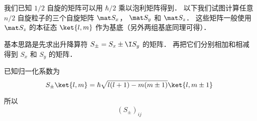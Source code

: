 

我们已知 $1/2$ 自旋的矩阵可以用 $\hbar/2$ 乘以泡利矩阵得到． 以下我们试图计算任意 $n/2$ 自旋粒子的三个自旋矩阵 $\mat S_x$， $\mat S_y$ 和 $\mat S_z$． 这些矩阵一般使用 $\mat S_z$ 的本征态 $\ket{l, m}$ 作为基底（另外两组基底同理可得）．

基本思路是先求出升降算符 $S_\pm = S_x \pm \I S_y$ 的矩阵． 再把它们分别相加和相减得到 $S_x$ 和 $S_y$ 的矩阵．

已知归一化系数为
\begin{equation}
S_\pm \ket{l,m} = \hbar \sqrt{l(l + 1) - m(m \pm 1)} \ket{l,m\pm1}
\end{equation}

所以
\begin{equation}
(S_\pm)_{ij}
\end{equation}

